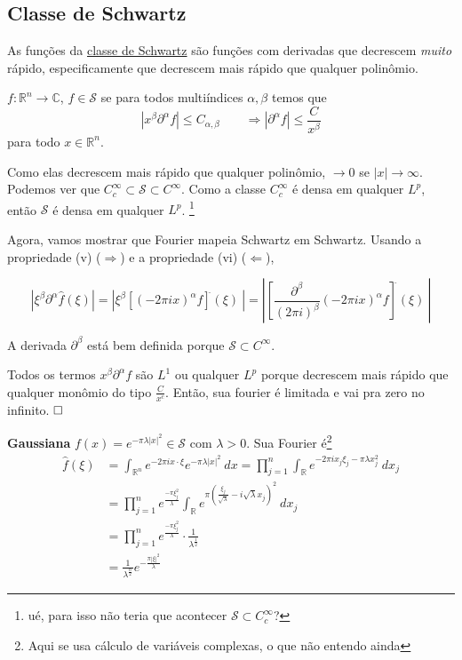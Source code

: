 \documentclass[11pt]{article}
\newcommand{\qed}{$\hfill\square$}
\newcommand{\R}{\mathbb{R}}
\newcommand{\C}{\mathbb{C}}
\newcommand{\Rn}{{\mathbb{R}^n}}
\newcommand{\p}{\partial}
\newcommand{\parentesis}[1]{\left(#1\right)}
\begin{document}
\subsection{Classe de Schwartz}

As funções da \href{https://en.wikipedia.org/wiki/Schwartz_space}{classe de Schwartz} são funções com derivadas que decrescem \textit{muito} rápido, especificamente que decrescem mais rápido que qualquer polinômio. 

\(f:\Rn \rightarrow \C\), \(f \in \mathcal{S}\) se para todos multiíndices \(\alpha, \beta\) temos que  \[ \left| x^\beta \partial^\alpha f \right| \leq C_{\alpha, \beta} \qquad \Rightarrow |\partial^\alpha f| \leq \frac{C}{x^\beta}\] para todo \(x \in \Rn\).

Como elas decrescem mais rápido que qualquer polinômio, \(\rightarrow 0\) se \(|x| \rightarrow \infty\). Podemos ver que \(C^\infty_c \subset \mathcal{S} \subset C^\infty \). Como a classe \(C^\infty_c\) é densa em qualquer \(L^p\), então \(\mathcal{S}\) é densa em qualquer \(L^p\). \footnote{ué, para isso não teria que acontecer \(\mathcal{S} \subset C^\infty_c\)?}

Agora, vamos mostrar que Fourier mapeia Schwartz em Schwartz. Usando a propriedade (v) (\(\Rightarrow\)) e a propriedade (vi) (\(\Leftarrow\)),

\[ \left| \xi^\beta \partial^\alpha \hat{f}(\xi) \right| = \left| \xi^\beta \left[ (-2\pi i x)^\alpha f\right]^{\hat{}}(\xi)\ \right| = \left|  \left[   \frac{\partial^\beta}{(2\pi i)^\beta}    (-2\pi i x)^\alpha f\right]^{\hat{}}(\xi)\ \right|  \]

A derivada \(\partial^\beta\) está bem definida porque \(\mathcal{S} \subset C^\infty\).

Todos os termos \(x^\beta \p^\alpha f\) são \(L^1\) ou qualquer \(L^p\) porque decrescem mais rápido que qualquer monômio do tipo \(\frac{C}{x^{c}}\).  Então, sua fourier é limitada e vai pra zero no infinito. \qed 

\textbf{Gaussiana}
\(f(x) = e^{-\pi \lambda |x|^2} \in \mathcal{S}\) com \(\lambda>0\). Sua Fourier é\footnote{Aqui se usa cálculo de variáveis complexas, o que não entendo ainda} \begin{align*}
	\hat{f}(\xi)&= \int_\Rn e^{-2\pi i x \cdot \xi } e^{-\pi \lambda |x|^2}\ dx 
	= \prod_{j=1}^{n}\int_\R e^{-2\pi i x_j \xi_j  - \pi \lambda x_j^2}\ dx_j\\ &= \prod_{j=1}^n e^{ \frac{-\pi \xi_j^2}{\lambda}} \int_\R e^{\pi \parentesis{\frac{\xi_j}{\sqrt{\lambda}} - i \sqrt{\lambda} x_j }^2}\ dx_j \\
	&= \prod_{j=1}^n e^{ \frac{-\pi \xi_j^2}{\lambda}} \cdot \frac{1}{\lambda^{\frac{1}{2}}}\\
	&= \frac{1}{\lambda^{\frac{n}{2}}}e^{-\frac{\pi |\xi|^2}{\lambda}}
\end{align*}
\end{document}
